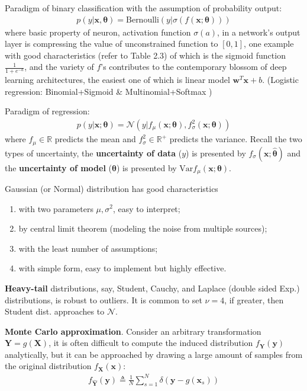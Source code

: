 Paradigm of binary classification with the assumption of probability output:
\begin{gather}
    p(y|\bm{x},\bm{\theta})
    =\text{Bernoulli}(y|\sigma(f(\bm{x};\bm{\theta})))
\end{gather}
where basic property of neuron, activation function $\sigma(a)$, in a network's output layer is compressing the value of unconstrained function to $[0,1]$, 
one example with good characteristics (refer to \citep{pml1Book} Table 2.3) 
of which is the sigmoid function $\frac{1}{1+e^{-a}}$, 
and the variety of $f$'s contributes to the contemporary blossom of deep learning architectures, 
the easiest one of which is linear model $\bm{w}^T\bm{x}+b$. (Logistic regression: Binomial+Sigmoid \& Multinomial+Softmax
)

Paradigm of regression:
\begin{gather}
    p(y|\bm{x};\bm{\theta})
    =\mathcal{N}(y|
    f_\mu(\bm{x};\bm{\theta}),
    f_\sigma^2(\bm{x};\bm{\theta})
    )
\end{gather}
where $f_\mu\in\mathbb{R}$ predicts the mean 
and $f_\sigma^2\in\mathbb{R}^+$ predicts the variance.
Recall the two types of uncertainty,
the \textbf{uncertainty of data} ($y$) is presented by $f_\sigma(\bm{x};\bm{\hat{\theta}})$ and 
the \textbf{uncertainty of model} ($\bm{\theta}$) is presented by 
$\mathrm{Var}f_\mu(\bm{x};\bm{\theta})$.

Gaussian (or Normal) distribution has good characteristics
\begin{enumerate}
    \item with two parameters $\mu,\sigma^2$, easy to interpret;
    \item by central limit theorem (modeling the noise from multiple sources);
    \item with the least number of assumptions;
    \item with simple form, easy to implement but highly effective.
\end{enumerate}

\textbf{Heavy-tail} distributions, say, 
Student, Cauchy, and Laplace (double sided Exp.) distributions, 
is robust to outliers. 
It is common to set $\nu=4$, if greater, then Student dist. approaches to $\mathcal{N}$.

\textbf{Monte Carlo approximation}. 
Consider an arbitrary transformation $\bm{Y}=g(\bm{X})$,
it is often difficult to compute the induced distribution $f_{\bm{Y}}(\bm{y})$ analytically,
but it can be approached by drawing a large amount of samples 
from the original distribution $f_{\bm{X}}(\bm{x})$:
\begin{gather}
    f_{\hat{\bm{Y}}}(\bm{y})
    \triangleq
    \frac{1}{N}\sum_{s=1}^N\delta(\bm{y}-g(\bm{x}_s))
\end{gather}



